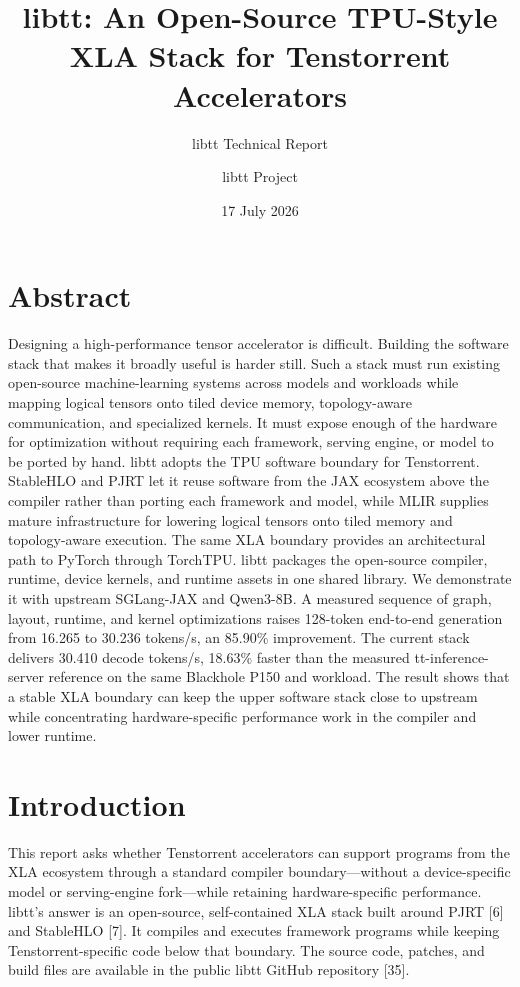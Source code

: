 \documentclass[
  10pt,
  american,
  10pt,
  letterpaper]{article}
\title{libtt: An Open-Source TPU-Style XLA Stack for Tenstorrent
Accelerators}
\subtitle{libtt Technical Report}
\author{libtt Project}
\date{17 July 2026}
\begin{document}
\maketitle

\hypertarget{abstract}{%
\section*{Abstract}\label{abstract}}

Designing a high-performance tensor accelerator is difficult. Building
the software stack that makes it broadly useful is harder still. Such a
stack must run existing open-source machine-learning systems across
models and workloads while mapping logical tensors onto tiled device
memory, topology-aware communication, and specialized kernels. It must
expose enough of the hardware for optimization without requiring each
framework, serving engine, or model to be ported by hand. libtt adopts
the TPU software boundary for Tenstorrent. StableHLO and PJRT let it
reuse software from the JAX ecosystem above the compiler rather than
porting each framework and model, while MLIR supplies mature
infrastructure for lowering logical tensors onto tiled memory and
topology-aware execution. The same XLA boundary provides an
architectural path to PyTorch through TorchTPU. libtt packages the
open-source compiler, runtime, device kernels, and runtime assets in one
shared library. We demonstrate it with upstream SGLang-JAX and Qwen3-8B.
A measured sequence of graph, layout, runtime, and kernel optimizations
raises 128-token end-to-end generation from 16.265 to 30.236 tokens/s,
an 85.90\% improvement. The current stack delivers 30.410 decode
tokens/s, 18.63\% faster than the measured tt-inference-server reference
on the same Blackhole P150 and workload. The result shows that a stable
XLA boundary can keep the upper software stack close to upstream while
concentrating hardware-specific performance work in the compiler and
lower runtime.

\hypertarget{introduction}{%
\section{Introduction}\label{introduction}}

This report asks whether Tenstorrent accelerators can support programs
from the XLA ecosystem through a standard compiler boundary---without a
device-specific model or serving-engine fork---while retaining
hardware-specific performance. libtt's answer is an open-source,
self-contained XLA stack built around PJRT {[}6{]} and StableHLO
{[}7{]}. It compiles and executes framework programs while keeping
Tenstorrent-specific code below that boundary. The source code, patches,
and build files are available in the public libtt GitHub repository
{[}35{]}.
\end{document}
